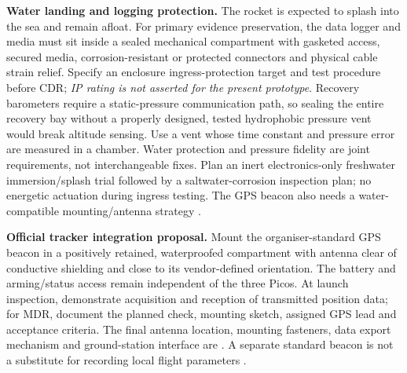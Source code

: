 \textbf{Water landing and logging protection.} The rocket is expected to splash into the sea and remain afloat. For primary evidence preservation, the data logger and media must sit inside a sealed mechanical compartment with gasketed access, secured media, corrosion-resistant or protected connectors and physical cable strain relief. Specify an enclosure ingress-protection target and test procedure before CDR; \emph{IP rating is not asserted for the present prototype}. Recovery barometers require a static-pressure communication path, so sealing the entire recovery bay without a properly designed, tested hydrophobic pressure vent would break altitude sensing. Use a vent whose time constant and pressure error are measured in a chamber. Water protection and pressure fidelity are joint requirements, not interchangeable fixes. Plan an inert electronics-only freshwater immersion/splash trial followed by a saltwater-corrosion inspection plan; no energetic actuation during ingress testing. The GPS beacon also needs a water-compatible mounting/antenna strategy \cite{rtc2027app03,rtc2027app08}.

\textbf{Official tracker integration proposal.} Mount the organiser-standard GPS beacon in a positively retained, waterproofed compartment with antenna clear of conductive shielding and close to its vendor-defined orientation. The battery and arming/status access remain independent of the three Picos. At launch inspection, demonstrate acquisition and reception of transmitted position data; for MDR, document the planned check, mounting sketch, assigned GPS lead and acceptance criteria. The final antenna location, mounting fasteners, data export mechanism and ground-station interface are . A separate standard beacon is not a substitute for recording local flight parameters \cite{rtc2027app03}.

